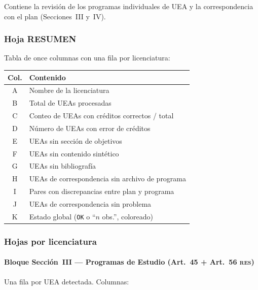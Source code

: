 \documentclass[11pt,a4paper]{article}
\newcommand{\RES}{\textsc{res}}
\begin{document}
Contiene la revisión de los programas individuales de UEA y la correspondencia
con el plan (Secciones~III y~IV).

\subsubsection{Hoja RESUMEN}

Tabla de once columnas con una fila por licenciatura:

\begin{center}
\begin{tabular}{cl}
\toprule
\textbf{Col.} & \textbf{Contenido} \\
\midrule
A & Nombre de la licenciatura \\
B & Total de UEAs procesadas \\
C & Conteo de UEAs con créditos correctos / total \\
D & Número de UEAs con error de créditos \\
E & UEAs sin sección de objetivos \\
F & UEAs sin contenido sintético \\
G & UEAs sin bibliografía \\
H & UEAs de correspondencia sin archivo de programa \\
I & Pares con discrepancias entre plan y programa \\
J & UEAs de correspondencia sin problema \\
K & Estado global (\texttt{OK} o ``$n$ obs.'', coloreado) \\
\bottomrule
\end{tabular}
\end{center}

\subsubsection{Hojas por licenciatura}

\paragraph{Bloque Sección~III --- Programas de Estudio (Art.\ 45 + Art.\ 56 \RES{})}

Una fila por UEA detectada. Columnas:
\end{document}

